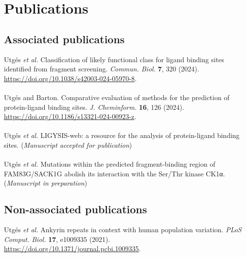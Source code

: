 \chapter*{Publications}

\section*{Associated publications}

Utgés \textit{et al.} Classification of likely functional class for ligand binding sites identified from fragment screening. \textit{Commun. Biol.} \textbf{7}, 320 (2024). \url{https://doi.org/10.1038/s42003-024-05970-8}.
\\\\ 
\noindent
Utgés and Barton. Comparative evaluation of methods for the prediction of protein-ligand binding sites. \textit{J. Cheminform.} \textbf{16}, 126 (2024). \url{https://doi.org/10.1186/s13321-024-00923-z}.
\\\\ 
\noindent
Utgés \textit{et al.} LIGYSIS-web: a resource for the analysis of protein-ligand binding sites. (\textit{Manuscript accepted for publication})
\\\\ 
\noindent
Utgés \textit{et al.} Mutations within the predicted fragment-binding region of FAM83G/SACK1G abolish its interaction with the Ser/Thr kinase CK1α. (\textit{Manuscript in preparation})

\section*{Non-associated publications}

Utgés \textit{et al.} Ankyrin repeats in context with human population variation. \textit{PLoS Comput. Biol.} \textbf{17}, e1009335 (2021). \url{https://doi.org/10.1371/journal.pcbi.1009335}.